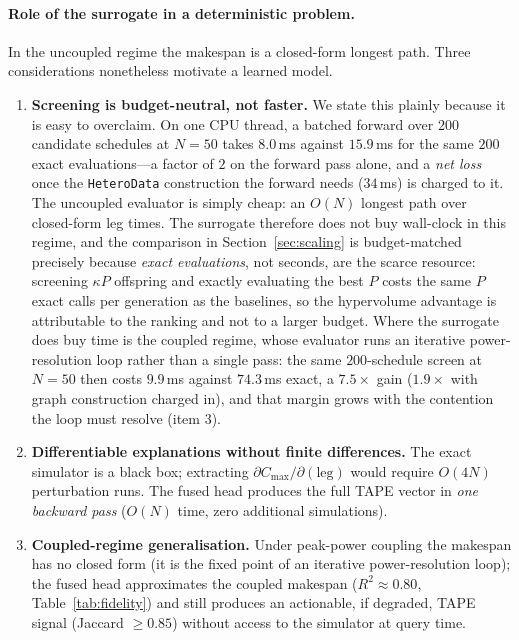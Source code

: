 \documentclass[11pt]{article}
\newcommand{\Cmax}{C_{\max}}
\begin{document}
\paragraph{Role of the surrogate in a deterministic problem.} In the uncoupled regime the
makespan is a closed-form longest path. Three considerations nonetheless motivate a learned
model.
\begin{enumerate}[nosep,leftmargin=*]
\item \textbf{Screening is budget-neutral, not faster.} We state this plainly because it
  is easy to overclaim. On one CPU thread, a batched forward over $200$ candidate schedules
  at $N{=}50$ takes $8.0$\,ms against $15.9$\,ms for the same $200$ exact evaluations---a
  factor of $2$ on the forward pass alone, and a \emph{net loss} once the
  \texttt{HeteroData} construction the forward needs ($34$\,ms) is charged to it. The
  uncoupled evaluator is simply cheap: an $O(N)$ longest path over closed-form leg times.
  The surrogate therefore does not buy wall-clock in this regime, and the comparison in
  Section~\ref{sec:scaling} is budget-matched precisely because \emph{exact evaluations},
  not seconds, are the scarce resource: screening $\kappa P$ offspring and exactly
  evaluating the best $P$ costs the same $P$ exact calls per generation as the baselines,
  so the hypervolume advantage is attributable to the ranking and not to a larger budget.
  Where the surrogate does buy time is the coupled regime, whose evaluator runs an
  iterative power-resolution loop rather than a single pass: the same $200$-schedule
  screen at $N{=}50$ then costs $9.9$\,ms against $74.3$\,ms exact, a $7.5\times$ gain
  ($1.9\times$ with graph construction charged in), and that margin grows with the
  contention the loop must resolve (item 3).
\item \textbf{Differentiable explanations without finite differences.} The exact simulator
  is a black box; extracting $\partial\Cmax/\partial(\text{leg})$ would require $O(4N)$
  perturbation runs. The fused head produces the full TAPE vector in \emph{one backward
  pass} ($O(N)$ time, zero additional simulations).
\item \textbf{Coupled-regime generalisation.} Under peak-power coupling the makespan has
  no closed form (it is the fixed point of an iterative power-resolution loop); the
  fused head approximates the coupled makespan ($R^2\approx 0.80$,
  Table~\ref{tab:fidelity}) and still produces an actionable, if degraded, TAPE signal
  (Jaccard $\geq 0.85$) without access to the simulator at query time.
\end{enumerate}
\end{document}
